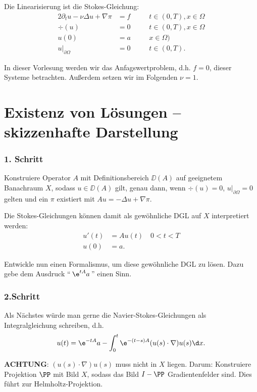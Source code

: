 Die Linearisierung ist die Stokes-Gleichung:
\begin{alignat*}{2}
  \partial_t u - \nu \Delta u + \nabla \pi &= f \quad&& t \in (0,T), x \in \Omega \\
  \div(u) &= 0 \quad&&t \in (0,T), x \in \Omega \\
  u(0) &= a \quad&& x \in \Omega) \\
  u|_{\partial\Omega} &= 0 \quad&& t \in (0,T).
\end{alignat*}

In dieser Vorlesung werden wir das Anfagswertproblem, d.h. $f = 0$, dieser Systeme betrachten. 
Außerdem setzen wir im Folgenden $\nu = 1$.

\section{Existenz von Lösungen -- skizzenhafte Darstellung}

\subsubsection*{1. Schritt}

Konstruiere Operator $A$ mit Definitionsbereich $\DD(A)$ auf geeignetem Banachraum $X$, sodass $u \in \DD(A)$ gilt, genau dann, wenn $\div(u) = 0$, $u|_{\partial \Omega} = 0$ gelten und ein $\pi$ existiert mit $Au = -\Delta u + \nabla \pi$.

Die Stokes-Gleichungen können damit als gewöhnliche DGL auf $X$ interpretiert werden:
\begin{align*}
  u'(t) &= Au(t) \quad 0 < t < T\\
  u(0) &= a.
\end{align*}

Entwickle nun einen Formalismus, um diese gewöhnliche DGL zu lösen. Dazu gebe dem Ausdruck ``$\, \e^{tA} a \, $'' einen Sinn.

\subsubsection*{2.Schritt}

Als Nächstes würde man gerne die Navier-Stokes-Gleichungen als Integralgleichung schreiben, d.h.
$$
 u(t) = \e^{-tA} a - \int_0^t \e^{-(t - s)A} (u(s) \cdot \nabla) u(s) \d x.
$$

\textbf{ACHTUNG}: $(u(s) \cdot \nabla) u(s)$ muss nicht in $X$ liegen. Darum: Konstruiere Projektion $\PP$ mit Bild $X$, sodass das Bild $I - \PP$ Gradientenfelder sind. Dies führt zur Helmholtz-Projektion.

